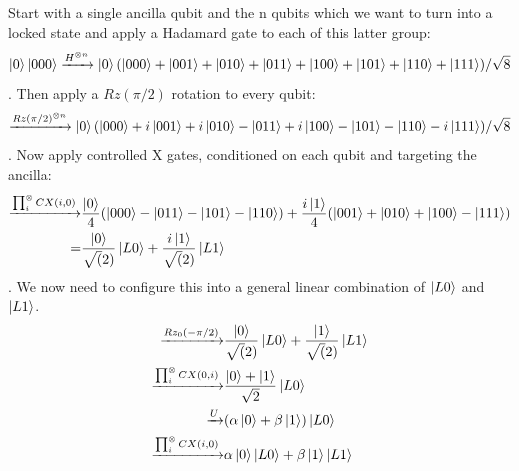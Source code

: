\documentclass{report}
\begin{document}
\begin{appendices}
Start with a single ancilla qubit and the n qubits which we want to turn into a locked state and apply a Hadamard gate to each of this latter group:
\begin{equation*}
    \ket{0}\ket{000}\xrightarrow{H^{\otimes n}} \ket{0}(\ket{000} + \ket{001} + \ket{010} + \ket{011} + \ket{100} + \ket{101} + \ket{110} + \ket{111})/\sqrt{8}
\end{equation*}.
Then apply a $Rz(\pi/2)$ rotation to every qubit:
\begin{equation*}
    \xrightarrow{Rz(\pi/2)^{\otimes n}} \ket{0}(\ket{000} + i\ket{001} + i \ket{010} - \ket{011} + i \ket{100} - \ket{101} - \ket{110} -i \ket{111})/\sqrt{8}
\end{equation*}. Now apply controlled X gates, conditioned on each qubit and targeting the ancilla:
\begin{align*}
    \xrightarrow{\prod_i^\otimes{CX(i,0)}} &\frac{\ket{0}}{4}(\ket{000} - \ket{011} - \ket{101} - \ket{110})
    + \frac{i\ket{1}}{4}(\ket{001} + \ket{010} + \ket{100} - \ket{111})\\
    = &\frac{\ket{0}}{\sqrt(2)}\ket{L0} + \frac{i\ket{1}}{\sqrt(2)}\ket{L1}
\end{align*}. We now need to configure this into a general linear combination of $\ket{L0}$ and $\ket{L1}$.
\begin{align*}
    \xrightarrow{Rz_0(-\pi/2)} &\frac{\ket{0}}{\sqrt(2)}\ket{L0} + \frac{\ket{1}}{\sqrt(2)}\ket{L1}\\
    \xrightarrow{\prod_i^\otimes{CX(0,i)}} & \frac{\ket{0} + \ket{1}}{\sqrt{2}}\ket{L0}\\
    \xrightarrow{U} & (\alpha\ket{0} + \beta\ket{1})\ket{L0}\\
    \xrightarrow{\prod_i^\otimes{CX(i,0)}} & \alpha\ket{0}\ket{L0} + \beta\ket{1}\ket{L1}
\end{align*}

\end{appendices}
\end{document}
